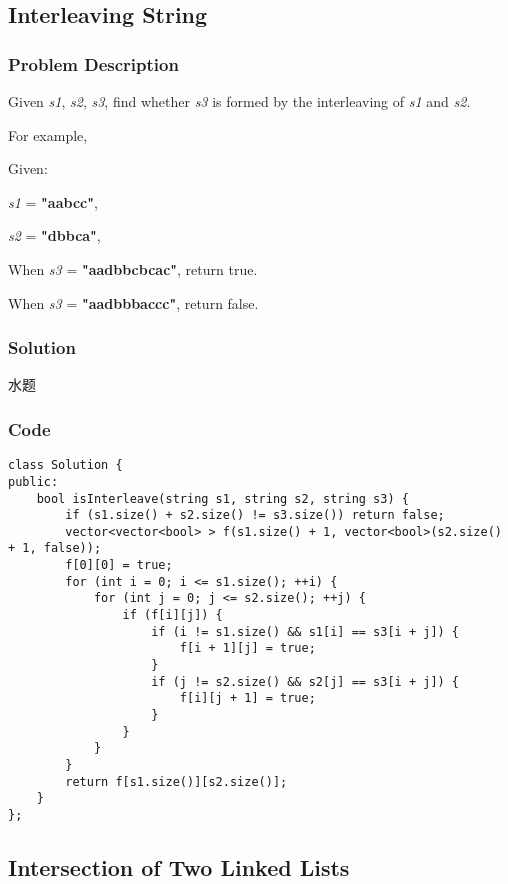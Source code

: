 \documentclass[courier]{article}
\begin{document}
\begin{CJK*}{UTF8}{gkai}
\subsection{ Interleaving String }

\subsubsection*{Problem Description}
Given \emph{s1}, \emph{s2}, \emph{s3}, find whether \emph{s3} is formed by the interleaving of \emph{s1} and \emph{s2}.

For example,


Given:


\emph{s1} = \textbf{"aabcc"},


\emph{s2} = \textbf{"dbbca"},

When \emph{s3} = \textbf{"aadbbcbcac"}, return true.


When \emph{s3} = \textbf{"aadbbbaccc"}, return false.



\subsubsection*{Solution}
水题

\subsubsection*{Code}
\begin{lstlisting}
class Solution {
public:
    bool isInterleave(string s1, string s2, string s3) {
        if (s1.size() + s2.size() != s3.size()) return false;
        vector<vector<bool> > f(s1.size() + 1, vector<bool>(s2.size() + 1, false));
        f[0][0] = true;
        for (int i = 0; i <= s1.size(); ++i) {
            for (int j = 0; j <= s2.size(); ++j) {
                if (f[i][j]) {
                    if (i != s1.size() && s1[i] == s3[i + j]) {
                        f[i + 1][j] = true;
                    }
                    if (j != s2.size() && s2[j] == s3[i + j]) {
                        f[i][j + 1] = true;
                    }
                }
            }
        }
        return f[s1.size()][s2.size()];
    }
}; 
\end{lstlisting}


\subsection{ Intersection of Two Linked Lists }


\end{CJK*}
\end{document}
